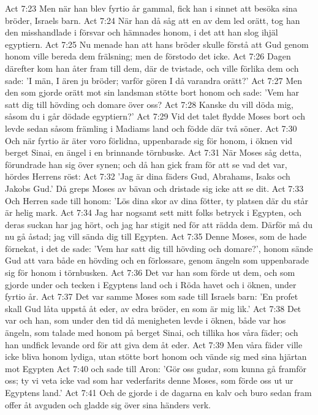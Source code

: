 Act 7:23  Men när han blev fyrtio år gammal, fick han i sinnet att besöka sina bröder, Israels barn.
Act 7:24  När han då såg att en av dem led orätt, tog han den misshandlade i försvar och hämnades honom, i det att han slog ihjäl egyptiern.
Act 7:25  Nu menade han att hans bröder skulle förstå att Gud genom honom ville bereda dem frälsning; men de förstodo det icke.
Act 7:26  Dagen därefter kom han åter fram till dem, där de tvistade, och ville förlika dem och sade: 'I män, I ären ju bröder; varför gören I då varandra orätt?'
Act 7:27  Men den som gjorde orätt mot sin landsman stötte bort honom och sade: 'Vem har satt dig till hövding och domare över oss?
Act 7:28  Kanske du vill döda mig, såsom du i går dödade egyptiern?'
Act 7:29  Vid det talet flydde Moses bort och levde sedan såsom främling i Madiams land och födde där två söner.
Act 7:30  Och när fyrtio är äter voro förlidna, uppenbarade sig för honom, i öknen vid berget Sinai, en ängel i en brinnande törnbuske.
Act 7:31  När Moses såg detta, förundrade han sig över synen; och då han gick fram för att se vad det var, hördes Herrens röst:
Act 7:32  'Jag är dina fäders Gud, Abrahams, Isaks och Jakobs Gud.' Då greps Moses av bävan och dristade sig icke att se dit.
Act 7:33  Och Herren sade till honom: 'Lös dina skor av dina fötter, ty platsen där du står är helig mark.
Act 7:34  Jag har nogsamt sett mitt folks betryck i Egypten, och deras suckan har jag hört, och jag har stigit ned för att rädda dem. Därför må du nu gå åstad; jag vill sända dig till Egypten.
Act 7:35  Denne Moses, som de hade förnekat, i det de sade: 'Vem har satt dig till hövding och domare?', honom sände Gud att vara både en hövding och en förlossare, genom ängeln som uppenbarade sig för honom i törnbusken.
Act 7:36  Det var han som förde ut dem, och som gjorde under och tecken i Egyptens land och i Röda havet och i öknen, under fyrtio år.
Act 7:37  Det var samme Moses som sade till Israels barn: 'En profet skall Gud låta uppstå åt eder, av edra bröder, en som är mig lik.'
Act 7:38  Det var och han, som under den tid då menigheten levde i öknen, både var hos ängeln, som talade med honom på berget Sinai, och tillika hos våra fäder; och han undfick levande ord för att giva dem åt eder.
Act 7:39  Men våra fäder ville icke bliva honom lydiga, utan stötte bort honom och vände sig med sina hjärtan mot Egypten
Act 7:40  och sade till Aron: 'Gör oss gudar, som kunna gå framför oss; ty vi veta icke vad som har vederfarits denne Moses, som förde oss ut ur Egyptens land.'
Act 7:41  Och de gjorde i de dagarna en kalv och buro sedan fram offer åt avguden och gladde sig över sina händers verk.
